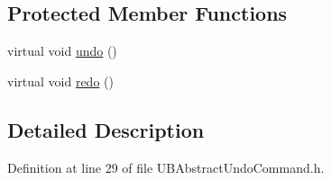 \subsection*{Protected Member Functions}
\begin{DoxyCompactItemize}
\item 
virtual void \hyperlink{class_u_b_abstract_undo_command_a91cd202e68ba7cc83f8490a6eec15dcc}{undo} ()
\item 
virtual void \hyperlink{class_u_b_abstract_undo_command_a6de13cf6ae729763431413aa39b78e82}{redo} ()
\end{DoxyCompactItemize}


\subsection{Detailed Description}


Definition at line 29 of file U\-B\-Abstract\-Undo\-Command.\-h.



